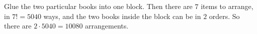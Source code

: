 Glue the two particular books into one block. Then there are $7$ items to arrange, in $7!=5040$ ways, and the two books inside the block can be in $2$ orders. So there are $2\cdot5040=\boxed{10080}$ arrangements.
